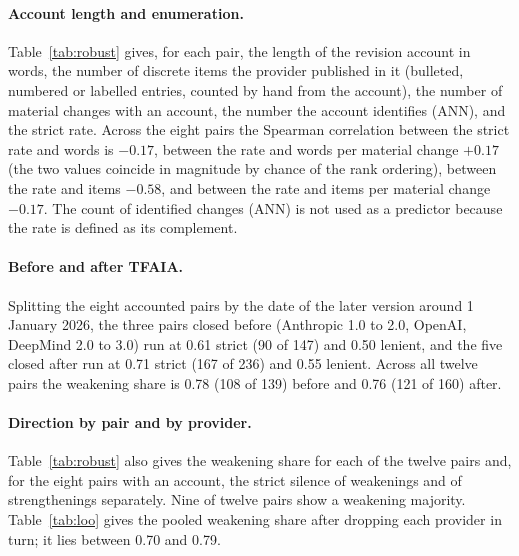 \documentclass{article}
\begin{document}
\paragraph{Account length and enumeration.} Table~\ref{tab:robust} gives, for each pair, the length of the revision account in words, the number of discrete items the provider published in it (bulleted, numbered or labelled entries, counted by hand from the account), the number of material changes with an account, the number the account identifies (ANN), and the strict rate. Across the eight pairs the Spearman correlation between the strict rate and words is $-0.17$, between the rate and words per material change $+0.17$ (the two values coincide in magnitude by chance of the rank ordering), between the rate and items $-0.58$, and between the rate and items per material change $-0.17$. The count of identified changes (ANN) is not used as a predictor because the rate is defined as its complement.
\paragraph{Before and after TFAIA.} Splitting the eight accounted pairs by the date of the later version around 1 January 2026, the three pairs closed before (Anthropic 1.0 to 2.0, OpenAI, DeepMind 2.0 to 3.0) run at 0.61 strict (90 of 147) and 0.50 lenient, and the five closed after run at 0.71 strict (167 of 236) and 0.55 lenient. Across all twelve pairs the weakening share is 0.78 (108 of 139) before and 0.76 (121 of 160) after.
\paragraph{Direction by pair and by provider.} Table~\ref{tab:robust} also gives the weakening share for each of the twelve pairs and, for the eight pairs with an account, the strict silence of weakenings and of strengthenings separately. Nine of twelve pairs show a weakening majority. Table~\ref{tab:loo} gives the pooled weakening share after dropping each provider in turn; it lies between 0.70 and 0.79.
\begin{table}[H]\centering\scriptsize
\caption{Per-pair robustness quantities. Words and Items describe the revision account; Mat.\ (acct) and ANN count material changes on pairs with an account and those the account identifies; Traced counts material changes excluding additions, over which Weak.\ share is computed; the last column gives strict silence among weakenings and among strengthenings, with counts.}
\label{tab:robust}
\resizebox{\linewidth}{!}{}
\end{table}
\begin{table}[H]\centering\small
\caption{Leave-one-provider-out weakening share among traced material changes.}
\label{tab:loo}

\end{table}
\end{document}
